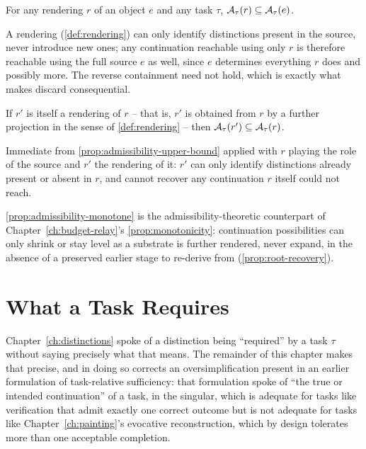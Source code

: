 \begin{proposition}
\label{prop:admissibility-upper-bound}
For any rendering $r$ of an object $e$ and any task $\tau$,
$\mathcal{A}_{\tau}(r) \subseteq \mathcal{A}_{\tau}(e)$.
\end{proposition}

\begin{proofsketch}
A rendering (\cref{def:rendering}) can only identify distinctions present
in the source, never introduce new ones; any continuation reachable using
only $r$ is therefore reachable using the full source $e$ as well, since
$e$ determines everything $r$ does and possibly more. The reverse
containment need not hold, which is exactly what makes discard
consequential.
\end{proofsketch}

\begin{proposition}
\label{prop:admissibility-monotone}
If $r'$ is itself a rendering of $r$ -- that is, $r'$ is obtained from $r$
by a further projection in the sense of \cref{def:rendering} -- then
$\mathcal{A}_{\tau}(r') \subseteq \mathcal{A}_{\tau}(r)$.
\end{proposition}

\begin{proofsketch}
Immediate from \cref{prop:admissibility-upper-bound} applied with $r$
playing the role of the source and $r'$ the rendering of it: $r'$ can only
identify distinctions already present or absent in $r$, and cannot
recover any continuation $r$ itself could not reach.
\end{proofsketch}

\cref{prop:admissibility-monotone} is the admissibility-theoretic
counterpart of Chapter~\ref{ch:budget-relay}'s
\cref{prop:monotonicity}: continuation possibilities can only shrink or
stay level as a substrate is further rendered, never expand, in the
absence of a preserved earlier stage to re-derive from
(\cref{prop:root-recovery}).

\section{What a Task Requires}

Chapter~\ref{ch:distinctions} spoke of a distinction being ``required'' by
a task $\tau$ without saying precisely what that means. The remainder of
this chapter makes that precise, and in doing so corrects an
oversimplification present in an earlier formulation of task-relative
sufficiency: that formulation spoke of ``the true or intended
continuation'' of a task, in the singular, which is adequate for tasks
like verification that admit exactly one correct outcome but is not
adequate for tasks like Chapter~\ref{ch:painting}'s evocative
reconstruction, which by design tolerates more than one acceptable
completion.

